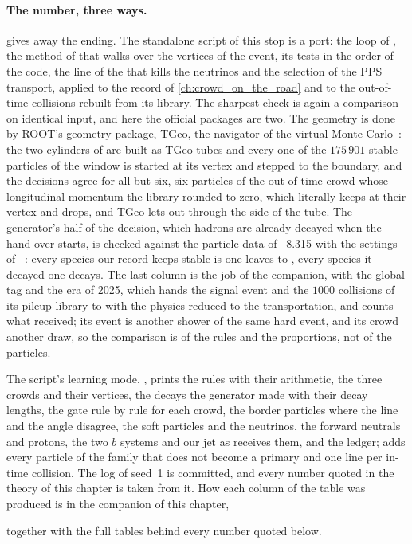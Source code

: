 \paragraph{The number, three ways.}
\label{sec:crossing_the_border:validation}
\label{sec:crossing_the_border:standalone_code}
 gives away the ending. The standalone script of this stop is a port: the
loop of
, the method of  that walks over the vertices of the event, its tests in the
order of the code, the line of the  that kills the
neutrinos and the selection of the PPS transport, applied to the record of
\cref{ch:crowd_on_the_road} and to the out-of-time collisions rebuilt from
its library. The sharpest check is again a comparison on identical input,
and here the official packages are two. The geometry is done by ROOT's
geometry package, TGeo, the navigator of the virtual Monte
Carlo~\cite{Brun:2003TGeo}: the two cylinders of  are
built as TGeo tubes and every one of the $175\,901$ stable particles of the
window is started at its vertex and stepped to the boundary, and the
decisions agree for all but six, six particles of the out-of-time crowd
whose longitudinal momentum the library rounded to zero, which
 literally keeps at their vertex and drops, and TGeo
lets out through the side of the tube. The generator's half of the decision,
which hadrons are already decayed when the hand-over starts, is checked
against the particle data of \PYTHIA~8.315 with the settings of
\CMSSW~\cite{Bierlich:2022pfr}: every species our record keeps stable is
one \PYTHIA leaves to \GEANT, every species it decayed one \PYTHIA decays.
The last column is the \CMSSW job of the companion, 
with the global tag and the era of 2025, which hands the signal event and
the $1000$ collisions of its pileup library to \GEANT with the physics
reduced to the transportation, and counts what \GEANT received; its event
is another shower of the same hard event, and its crowd another draw, so
the comparison is of the rules and the proportions, not of the particles.

The script's learning mode, , prints the rules with their
arithmetic, the three crowds and their vertices, the decays the generator
made with their decay lengths, the gate rule by rule for each crowd, the
border particles where the line and the angle disagree, the soft particles
and the neutrinos, the forward neutrals and protons, the two $b$ systems and
our jet as \GEANT receives them, and the ledger;  adds every
particle of the family that does not become a primary and one line per
in-time collision. The  log of seed~1 is committed, and every number
quoted in the theory of this chapter is taken from it. How each column of
the table was produced is in the companion of this chapter,
\begin{center}
\end{center}
together with the full tables behind every number quoted below.

